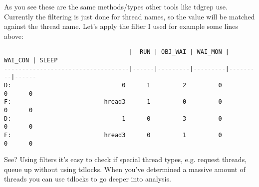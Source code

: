 As you see these are the same methods/types other tools like tdgrep use.
Currently the filtering is just done for thread names, so the value will be matched against the thread name.
Let's apply the filter I used for example some lines above:
\begin{lstlisting}
                                   |  RUN | OBJ_WAI | WAI_MON | WAI_CON | SLEEP
-----------------------------------|------|---------|---------|---------|------
D:                               0      1         2         0         0      0
F:                          hread3      1         0         0         0      0
D:                               1      0         3         0         0      0
F:                          hread3      0         1         0         0      0
\end{lstlisting}

See?
Using filters it's easy to check if special thread types, e.g. request threads, queue up without using tdlocks.
When you've determined a massive amount of threads you can use tdlocks to go deeper into analysis.
